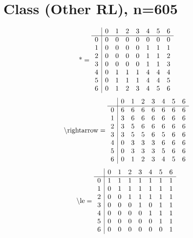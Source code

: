 \documentclass[11pt]{article}
\begin{document}
\section{Class (Other RL), n=605}
\[\text{*} = 
\begin{array}{r | r r r r r r r}
 & 0 & 1 & 2 & 3 & 4 & 5 & 6 \\ \hline
0 & 0 & 0 & 0 & 0 & 0 & 0 & 0 \\
1 & 0 & 0 & 0 & 0 & 1 & 1 & 1 \\
2 & 0 & 0 & 0 & 0 & 1 & 1 & 2 \\
3 & 0 & 0 & 0 & 0 & 1 & 1 & 3 \\
4 & 0 & 1 & 1 & 1 & 4 & 4 & 4 \\
5 & 0 & 1 & 1 & 1 & 4 & 4 & 5 \\
6 & 0 & 1 & 2 & 3 & 4 & 5 & 6 \\
\end{array}
\]
\[\text{\textbackslash rightarrow} = 
\begin{array}{r | r r r r r r r}
 & 0 & 1 & 2 & 3 & 4 & 5 & 6 \\ \hline
0 & 6 & 6 & 6 & 6 & 6 & 6 & 6 \\
1 & 3 & 6 & 6 & 6 & 6 & 6 & 6 \\
2 & 3 & 5 & 6 & 6 & 6 & 6 & 6 \\
3 & 3 & 5 & 5 & 6 & 5 & 6 & 6 \\
4 & 0 & 3 & 3 & 3 & 6 & 6 & 6 \\
5 & 0 & 3 & 3 & 3 & 5 & 6 & 6 \\
6 & 0 & 1 & 2 & 3 & 4 & 5 & 6 \\
\end{array}
\]
\[\text{\textbackslash le} = 
\begin{array}{r | r r r r r r r}
 & 0 & 1 & 2 & 3 & 4 & 5 & 6 \\ \hline
0 & 1 & 1 & 1 & 1 & 1 & 1 & 1 \\
1 & 0 & 1 & 1 & 1 & 1 & 1 & 1 \\
2 & 0 & 0 & 1 & 1 & 1 & 1 & 1 \\
3 & 0 & 0 & 0 & 1 & 0 & 1 & 1 \\
4 & 0 & 0 & 0 & 0 & 1 & 1 & 1 \\
5 & 0 & 0 & 0 & 0 & 0 & 1 & 1 \\
6 & 0 & 0 & 0 & 0 & 0 & 0 & 1 \\
\end{array}
\]
\end{document}
